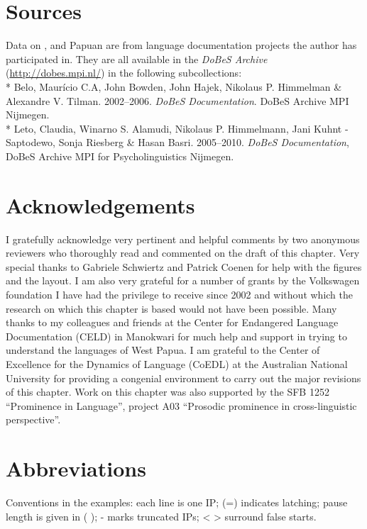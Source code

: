 \documentclass[output=paper
,modfonts
,nonflat]{langsci/langscibook}
\begin{document}
\section*{Sources}

Data on ,  and Papuan  are from language documentation projects the author has participated in. They are all available in the \textit{DoBeS Archive} (\url{http://dobes.mpi.nl/}) in the following subcollections:\\*
Belo, Maurício C.A, John Bowden, John Hajek, Nikolaus P. Himmelman \& Alexandre V. Tilman. 2002--2006. \textit{DoBeS  Documentation}. DoBeS Archive MPI Nijmegen.\\*
Leto, Claudia, Winarno S. Alamudi, Nikolaus P. Himmelmann, Jani Kuhnt - Saptodewo, Sonja  Riesberg \& Hasan  Basri. 2005--2010. \textit{DoBeS  Documentation}, DoBeS Archive MPI for Psycholinguistics Nijmegen.

\section*{Acknowledgements}

I gratefully acknowledge very pertinent and helpful comments by two anonymous reviewers who thoroughly read and commented on the draft of this chapter. Very special thanks to Gabriele Schwiertz and Patrick Coenen for help with the figures and the layout. I am also very grateful for a number of grants by the Volkswagen foundation I have had the privilege to receive since 2002 and without which the research on which this chapter is based would not have been possible. Many thanks to my colleagues and friends at the Center for Endangered Language Documentation (CELD) in Manokwari for much help and support in trying to understand the languages of West Papua. I am grateful to the Center of Excellence for the Dynamics of Language (CoEDL) at the Australian National University for providing a congenial environment to carry out the major revisions of this chapter. Work on this chapter was also supported by the SFB 1252 “Prominence in Language”, project A03 “Prosodic prominence in cross-linguistic perspective”.

\section*{Abbreviations}

Conventions in the examples: each line is one IP; (=) indicates latching; pause length is given in ( ); - marks truncated IPs; < > surround false starts.\\
\end{document}
